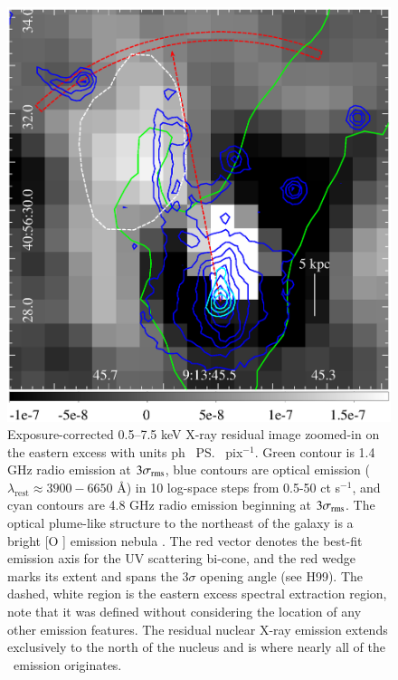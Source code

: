 \begin{figure}
  \begin{center}
    \begin{minipage}{\linewidth}
      \includegraphics*[width=\textwidth, trim=0mm 0mm 0mm 0mm, clip]{opt_xray.ps}
    \end{minipage}
    \caption{Exposure-corrected 0.5--7.5 keV X-ray residual image
      zoomed-in on the eastern excess with units ph
      \pcmsq\ \ps\ pix$^{-1}$. Green contour is 1.4 GHz radio emission
      at $3\sigma_{\rm{rms}}$, blue contours are optical emission
      ($\lambda_{\mathrm{rest}} \approx 3900-6650$ \AA) in 10
      log-space steps from 0.5-50 ct s$^{-1}$, and cyan contours are
      4.8 GHz radio emission beginning at $3\sigma_{\rm{rms}}$. The
      optical plume-like structure to the northeast of the galaxy is a
      bright [O ] emission nebula
      \citep[see][]{1996MNRAS.283.1003C}. The red vector denotes the
      best-fit emission axis for the UV scattering bi-cone, and the
      red wedge marks its extent and spans the $3\sigma$ opening angle
      (see H99). The dashed, white region is the eastern excess
      spectral extraction region, note that it was defined without
      considering the location of any other emission features. The
      residual nuclear X-ray emission extends exclusively to the north
      of the nucleus and is where nearly all of the \feka\ emission
      originates.}
    \label{fig:eex}
  \end{center}
\end{figure}

